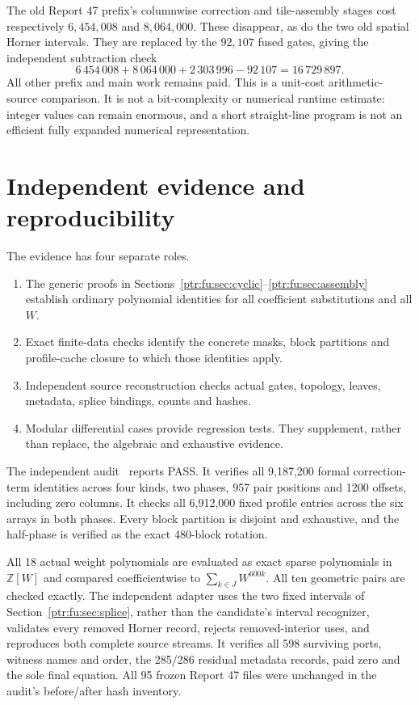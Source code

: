 \documentclass[11pt,letterpaper]{article}
\theoremstyle{definition}\newtheorem{definition}[theorem]{Definition}
\theoremstyle{remark}\newtheorem{remark}[theorem]{Remark}
\newcommand{\Z}{\mathbb Z}\newcommand{\N}{\mathbb N}\newcommand{\Zp}{\mathbb Z_{>0}}
\begin{document}
The old Report 47 prefix's columnwise correction and tile-assembly stages cost respectively $6,454,008$ and $8,064,000$. These disappear, as do the two old spatial Horner intervals. They are replaced by the $92,107$ fused gates, giving the independent subtraction check
\[
 6\,454\,008+8\,064\,000+2\,303\,996-92\,107
 =16\,729\,897.
\]
All other prefix and main work remains paid. This is a unit-cost arithmetic-source comparison. It is not a bit-complexity or numerical runtime estimate: integer values can remain enormous, and a short straight-line program is not an efficient fully expanded numerical representation.

\section{Independent evidence and reproducibility}\label{ptr:fu:sec:evidence}
The evidence has four separate roles.
\begin{enumerate}
\item The generic proofs in Sections~\ref{ptr:fu:sec:cyclic}--\ref{ptr:fu:sec:assembly} establish ordinary polynomial identities for all coefficient substitutions and all $W$.
\item Exact finite-data checks identify the concrete masks, block partitions and profile-cache closure to which those identities apply.
\item Independent source reconstruction checks actual gates, topology, leaves, metadata, splice bindings, counts and hashes.
\item Modular differential cases provide regression tests. They supplement, rather than replace, the algebraic and exhaustive evidence.
\end{enumerate}
The independent audit~\cite{ptr:fu:audit} reports PASS. It verifies all 9,187,200 formal correction-term identities across four kinds, two phases, 957 pair positions and 1200 offsets, including zero columns. It checks all 6,912,000 fixed profile entries across the six arrays in both phases. Every block partition is disjoint and exhaustive, and the half-phase is verified as the exact 480-block rotation.

All 18 actual weight polynomials are evaluated as exact sparse polynomials in $\Z[W]$ and compared coefficientwise to $\sum_{k\in J}W^{600k}$. All ten geometric pairs are checked exactly. The independent adapter uses the two fixed intervals of Section~\ref{ptr:fu:sec:splice}, rather than the candidate's interval recognizer, validates every removed Horner record, rejects removed-interior uses, and reproduces both complete source streams. It verifies all 598 surviving ports, witness names and order, the 285/286 residual metadata records, paid zero and the sole final equation. All 95 frozen Report 47 files were unchanged in the audit's before/after hash inventory.
\end{document}
